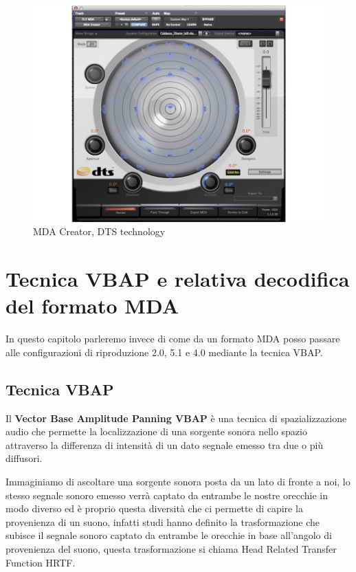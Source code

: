 \documentclass[12pt,a4paper]{report}
\begin{document}
\begin{figure}[htbp]
	\centering
	\includegraphics[scale=0.50]{figures/mdacreator.jpg}
	\caption {MDA Creator, DTS technology}
	\label{fig:mdacreator}
	\end{figure}

\chapter{Tecnica VBAP e relativa decodifica del formato MDA}

In questo capitolo parleremo invece di come da un formato MDA posso passare alle configurazioni di riproduzione 2.0, 5.1 e 4.0 mediante la tecnica VBAP.


\section{Tecnica VBAP}

Il \textbf{Vector Base Amplitude Panning VBAP} è una tecnica di spazializzazione audio che permette la localizzazione di  una sorgente sonora nello spazio attraverso la differenza di intensità di un dato segnale emesso tra due o più diffusori.

Immaginiamo di ascoltare una sorgente sonora posta da un lato di fronte a noi, lo stesso segnale sonoro emesso verrà captato da entrambe le nostre orecchie in modo diverso ed è proprio questa diversità che ci permette di capire la provenienza di un suono, infatti studi hanno definito la trasformazione che subisce il segnale sonoro captato da entrambe le orecchie in base all'angolo di provenienza del suono, questa trasformazione si chiama Head Related Transfer Function HRTF.
\end{document}
